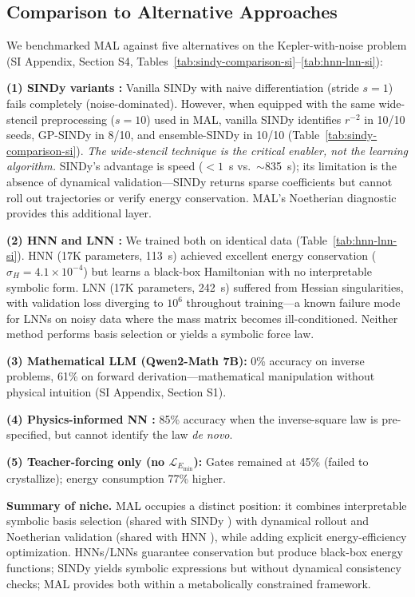 \documentclass[9pt,twocolumn,twoside]{pnas-new}
\begin{document}
\subsection*{Comparison to Alternative Approaches}
We benchmarked MAL against five alternatives on the Kepler-with-noise problem (SI Appendix, Section S4, Tables~\ref{tab:sindy-comparison-si}--\ref{tab:hnn-lnn-si}):

\textbf{(1) SINDy variants \cite{Brunton2016, Hirsh2022GPSINDy, Fasel2022EnsembleSINDy}:} Vanilla SINDy with naive differentiation (stride $s=1$) fails completely (noise-dominated). However, when equipped with the same wide-stencil preprocessing ($s=10$) used in MAL, vanilla SINDy identifies $r^{-2}$ in 10/10 seeds, GP-SINDy in 8/10, and ensemble-SINDy in 10/10 (Table~\ref{tab:sindy-comparison-si}). \textit{The wide-stencil technique is the critical enabler, not the learning algorithm.} SINDy's advantage is speed ($<1$~s vs.\ $\sim$835~s); its limitation is the absence of dynamical validation---SINDy returns sparse coefficients but cannot roll out trajectories or verify energy conservation. MAL's Noetherian diagnostic provides this additional layer.

\textbf{(2) HNN \cite{Greydanus2019} and LNN \cite{Cranmer2020LNN}:} We trained both on identical data (Table~\ref{tab:hnn-lnn-si}). HNN (17K parameters, 113~s) achieved excellent energy conservation ($\sigma_H = 4.1 \times 10^{-4}$) but learns a black-box Hamiltonian with no interpretable symbolic form. LNN (17K parameters, 242~s) suffered from Hessian singularities, with validation loss diverging to $10^6$ throughout training---a known failure mode for LNNs on noisy data where the mass matrix becomes ill-conditioned. Neither method performs basis selection or yields a symbolic force law.

\textbf{(3) Mathematical LLM (Qwen2-Math 7B):} 0\% accuracy on inverse problems, 61\% on forward derivation---mathematical manipulation without physical intuition (SI Appendix, Section S1).

\textbf{(4) Physics-informed NN \cite{Raissi2019}:} 85\% accuracy when the inverse-square law is pre-specified, but cannot identify the law \textit{de novo}.

\textbf{(5) Teacher-forcing only (no $\mathcal{L}_{E_{\min}}$):} Gates remained at 45\% (failed to crystallize); energy consumption 77\% higher.

\textbf{Summary of niche.} MAL occupies a distinct position: it combines interpretable symbolic basis selection (shared with SINDy \cite{Brunton2016}) with dynamical rollout and Noetherian validation (shared with HNN \cite{Greydanus2019}), while adding explicit energy-efficiency optimization. HNNs/LNNs \cite{Greydanus2019, Cranmer2020LNN} guarantee conservation but produce black-box energy functions; SINDy \cite{Brunton2016} yields symbolic expressions but without dynamical consistency checks; MAL provides both within a metabolically constrained framework.
\end{document}
